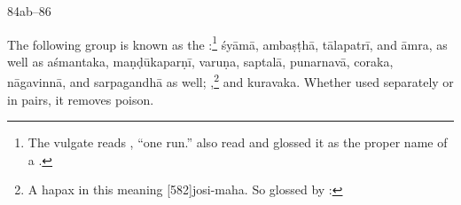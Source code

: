\begin{translation}
\item[84ab--86]
\begin{sloka}
    
    The following group is known as the :\footnote{The vulgate reads , “one run.”
     also read  and glossed it as
    the proper name of a .} \gls{śyāmā}, \gls{ambaṣṭhā},
    \gls{tālapatrī}, and \gls{āmra}, as well as \gls{aśmantaka},
    \gls{maṇḍūkaparṇī}, \gls{varuṇa}, \gls{saptalā}, \gls{punarnavā},
    \gls{coraka}, \gls{nāgavinnā}, and \gls{sarpagandhā} as well;
    ,\footnote{A hapax in this meaning
        [582]{josi-maha}.  So glossed by :
        } and \gls{kuravaka}. Whether used
        separately or in pairs, it  removes poison.

\end{sloka}

    
    \strut
    \bigskip
    
       
  
\end{translation}    